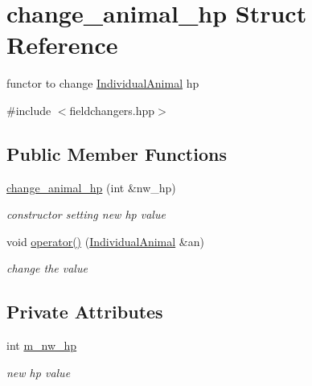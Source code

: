 \hypertarget{structchange__animal__hp}{
\section{change\_\-animal\_\-hp Struct Reference}
\label{structchange__animal__hp}
}


functor to change \hyperlink{classIndividualAnimal}{IndividualAnimal} hp  




{\ttfamily \#include $<$fieldchangers.hpp$>$}

\subsection*{Public Member Functions}
\begin{DoxyCompactItemize}
\item 
\hypertarget{structchange__animal__hp_a62c8ac720a8a79c9b07d2b360df7be2d}{
\hyperlink{structchange__animal__hp_a62c8ac720a8a79c9b07d2b360df7be2d}{change\_\-animal\_\-hp} (int \&nw\_\-hp)}
\label{structchange__animal__hp_a62c8ac720a8a79c9b07d2b360df7be2d}

\begin{DoxyCompactList}\small\item\em constructor setting new hp value \end{DoxyCompactList}\item 
\hypertarget{structchange__animal__hp_a1ee9b6cc693ae673b687e7b81e1cdc83}{
void \hyperlink{structchange__animal__hp_a1ee9b6cc693ae673b687e7b81e1cdc83}{operator()} (\hyperlink{classIndividualAnimal}{IndividualAnimal} \&an)}
\label{structchange__animal__hp_a1ee9b6cc693ae673b687e7b81e1cdc83}

\begin{DoxyCompactList}\small\item\em change the value \end{DoxyCompactList}\end{DoxyCompactItemize}
\subsection*{Private Attributes}
\begin{DoxyCompactItemize}
\item 
\hypertarget{structchange__animal__hp_a1a7e86389e8afd8624fdb0a49aabd42c}{
int \hyperlink{structchange__animal__hp_a1a7e86389e8afd8624fdb0a49aabd42c}{m\_\-nw\_\-hp}}
\label{structchange__animal__hp_a1a7e86389e8afd8624fdb0a49aabd42c}

\begin{DoxyCompactList}\small\item\em new hp value \end{DoxyCompactList}\end{DoxyCompactItemize}


